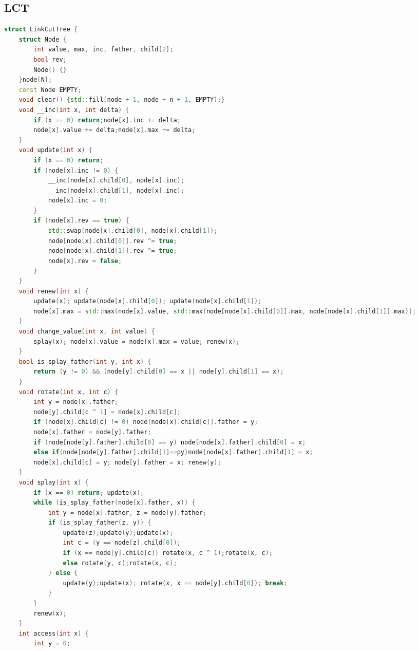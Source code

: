 \documentclass[landscape,a4paper]{article}
\begin{document}
\begin{spacing}{0.3}
\begin{multicols}{3}
		\subsection{LCT}
		\begin{lstlisting}[language=C++]
struct LinkCutTree {
    struct Node {
        int value, max, inc, father, child[2];
        bool rev;
        Node() {}
    }node[N];
    const Node EMPTY;
    void clear() {std::fill(node + 1, node + n + 1, EMPTY);}
    void __inc(int x, int delta) {
        if (x == 0) return;node[x].inc += delta;
        node[x].value += delta;node[x].max += delta;
    }
    void update(int x) {
        if (x == 0) return;
        if (node[x].inc != 0) {
            __inc(node[x].child[0], node[x].inc);
            __inc(node[x].child[1], node[x].inc);
            node[x].inc = 0;
        }
        if (node[x].rev == true) {
            std::swap(node[x].child[0], node[x].child[1]);
            node[node[x].child[0]].rev ^= true;
            node[node[x].child[1]].rev ^= true;
            node[x].rev = false;
        }
    }
    void renew(int x) {
        update(x); update(node[x].child[0]); update(node[x].child[1]);
        node[x].max = std::max(node[x].value, std::max(node[node[x].child[0]].max, node[node[x].child[1]].max));
    }
    void change_value(int x, int value) {
        splay(x); node[x].value = node[x].max = value; renew(x);
    }
    bool is_splay_father(int y, int x) {
        return (y != 0) && (node[y].child[0] == x || node[y].child[1] == x);
    }
    void rotate(int x, int c) {
        int y = node[x].father;
        node[y].child[c ^ 1] = node[x].child[c];
        if (node[x].child[c] != 0) node[node[x].child[c]].father = y;
        node[x].father = node[y].father;
        if (node[node[y].father].child[0] == y) node[node[x].father].child[0] = x;
        else if(node[node[y].father].child[1]==py)node[node[x].father].child[1] = x;
        node[x].child[c] = y; node[y].father = x; renew(y);
    }
    void splay(int x) {
        if (x == 0) return; update(x);
        while (is_splay_father(node[x].father, x)) {
            int y = node[x].father, z = node[y].father;
            if (is_splay_father(z, y)) {
                update(z);update(y);update(x);
                int c = (y == node[z].child[0]);
                if (x == node[y].child[c]) rotate(x, c ^ 1);rotate(x, c);
                else rotate(y, c);rotate(x, c);
            } else {
                update(y);update(x); rotate(x, x == node[y].child[0]); break;
            }
        }
        renew(x);
    }
    int access(int x) {
        int y = 0;

\end{lstlisting}
\end{multicols}
\end{spacing}
\end{document}
